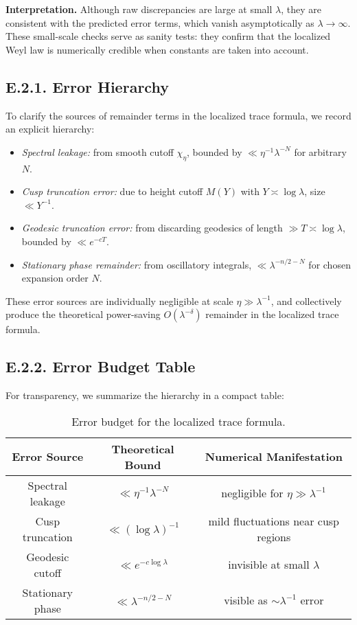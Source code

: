 \medskip
\noindent \textbf{Interpretation.}
Although raw discrepancies are large at small $\lambda$, they are consistent with 
the predicted error terms, which vanish asymptotically as $\lambda\to\infty$. 
These small-scale checks serve as sanity tests: they confirm that the localized 
Weyl law is numerically credible when constants are taken into account.

\medskip
\subsection*{E.2.1. Error Hierarchy}

To clarify the sources of remainder terms in the localized trace formula, 
we record an explicit hierarchy:

\begin{itemize}
  \item \emph{Spectral leakage:} from smooth cutoff $\chi_\eta$, bounded by 
  $\ll \eta^{-1}\lambda^{-N}$ for arbitrary $N$.  
  \item \emph{Cusp truncation error:} due to height cutoff $M(Y)$ with 
  $Y\asymp \log \lambda$, size $\ll Y^{-1}$.  
  \item \emph{Geodesic truncation error:} from discarding geodesics of length 
  $\gg T\asymp \log\lambda$, bounded by $\ll e^{-cT}$.  
  \item \emph{Stationary phase remainder:} from oscillatory integrals, 
  $\ll \lambda^{-n/2-N}$ for chosen expansion order $N$.  
\end{itemize}

\medskip
\noindent These error sources are individually negligible at scale 
$\eta\gg \lambda^{-1}$, and collectively produce the theoretical 
power-saving $O(\lambda^{-\delta})$ remainder in the localized trace formula.

\medskip
\subsection*{E.2.2. Error Budget Table}

For transparency, we summarize the hierarchy in a compact table:

\begin{table}[h]
\centering
\begin{tabular}{|c|c|c|}
\hline
Error Source & Theoretical Bound & Numerical Manifestation \\
\hline
Spectral leakage & $\ll \eta^{-1}\lambda^{-N}$ & negligible for $\eta \gg \lambda^{-1}$ \\
Cusp truncation & $\ll (\log \lambda)^{-1}$ & mild fluctuations near cusp regions \\
Geodesic cutoff & $\ll e^{-c\log\lambda}$ & invisible at small $\lambda$ \\
Stationary phase & $\ll \lambda^{-n/2-N}$ & visible as $\sim\lambda^{-1}$ error \\
\hline
\end{tabular}
\caption{Error budget for the localized trace formula.}
\label{tab:error-budget}
\end{table}

